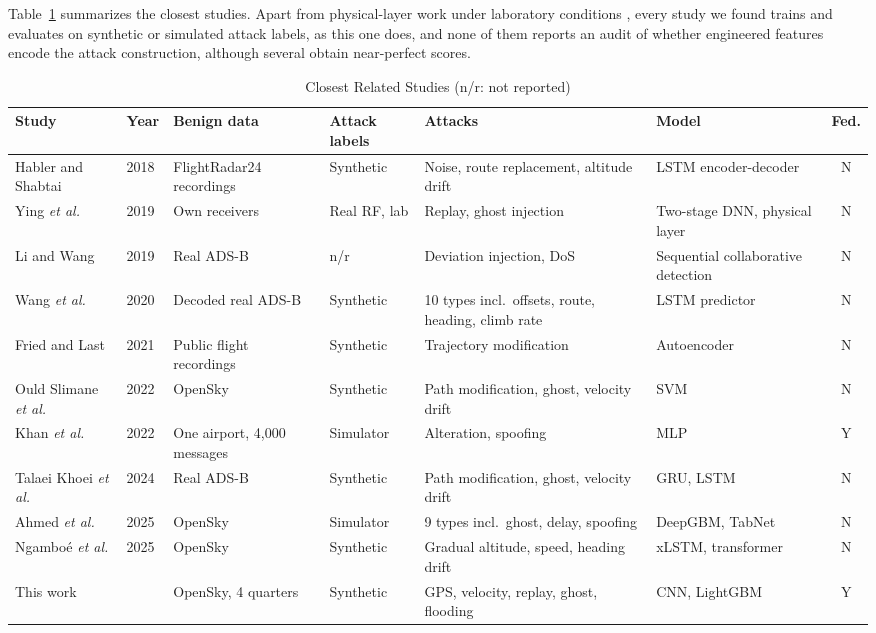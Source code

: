 \documentclass[conference]{IEEEtran}
\begin{document}
Table~\ref{tab:related} summarizes the closest studies. Apart from physical-layer work under laboratory conditions \cite{ying2019}, every study we found trains and evaluates on synthetic or simulated attack labels, as this one does, and none of them reports an audit of whether engineered features encode the attack construction, although several obtain near-perfect scores.

\begin{table}[!t]\caption{Closest Related Studies (n/r: not reported)}\label{tab:related}\centering\scriptsize
\begin{tabularx}{\textwidth}{l l l l X l c}\toprule
Study & Year & Benign data & Attack labels & Attacks & Model & Fed. \\\midrule
Habler and Shabtai \cite{habler2018} & 2018 & FlightRadar24 recordings & Synthetic & Noise, route replacement, altitude drift & LSTM encoder-decoder & N \\
Ying \emph{et al.} \cite{ying2019} & 2019 & Own receivers & Real RF, lab & Replay, ghost injection & Two-stage DNN, physical layer & N \\
Li and Wang \cite{li2019ijcip} & 2019 & Real ADS-B & n/r & Deviation injection, DoS & Sequential collaborative detection & N \\
Wang \emph{et al.} \cite{wang2020} & 2020 & Decoded real ADS-B & Synthetic & 10 types incl.\ offsets, route, heading, climb rate & LSTM predictor & N \\
Fried and Last \cite{fried2021} & 2021 & Public flight recordings & Synthetic & Trajectory modification & Autoencoder & N \\
Ould Slimane \emph{et al.} \cite{ouldslimane2022} & 2022 & OpenSky & Synthetic & Path modification, ghost, velocity drift & SVM & N \\
Khan \emph{et al.} \cite{khan2022flguard} & 2022 & One airport, 4,000 messages & Simulator & Alteration, spoofing & MLP & Y \\
Talaei Khoei \emph{et al.} \cite{khoei2024} & 2024 & Real ADS-B & Synthetic & Path modification, ghost, velocity drift & GRU, LSTM & N \\
Ahmed \emph{et al.} \cite{ahmed2025} & 2025 & OpenSky & Simulator & 9 types incl.\ ghost, delay, spoofing & DeepGBM, TabNet & N \\
Ngambo\'e \emph{et al.} \cite{ngamboe2025} & 2025 & OpenSky & Synthetic & Gradual altitude, speed, heading drift & xLSTM, transformer & N \\
This work & & OpenSky, 4 quarters & Synthetic & GPS, velocity, replay, ghost, flooding & CNN, LightGBM & Y \\
\bottomrule\end{tabularx}\end{table}
\end{document}
